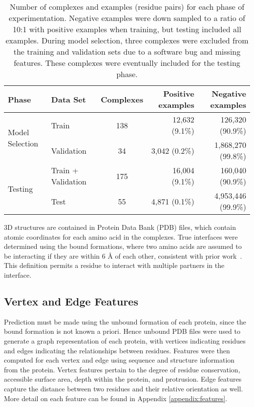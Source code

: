 \begin{table}
	\centering
	\begin{tabular}{l l c r r}
		\toprule
		Phase & Data Set & Complexes & Positive examples  & Negative examples \\ 
		\midrule
		\multirow{2}{*}{Model Selection} 
			& Train      & 138       & 12,632 (9.1\%)     & 126,320 (90.9\%) \\
			& Validation & 34        & 3,042 (0.2\%) 		& 1,868,270 (99.8\%) \\
		\midrule
		\multirow{2}{*}{Testing}
			& Train + Validation & 175 & 16,004 (9.1\%) & 160,040 (90.9\%) \\
			& Test       & 55        & 4,871 (0.1\%)      & 4,953,446 (99.9\%) \\ 
		\bottomrule
	\end{tabular}
	\caption{Number of complexes and examples (residue pairs) for each phase of experimentation. Negative examples were down sampled to a ratio of 10:1 with positive examples when training, but testing included all examples. During model selection, three complexes were excluded from the training and validation sets due to a software bug and missing features. These complexes were eventually included for the testing phase. \label{tab:dataset_size}}
	\label{tab:examples}
\end{table}

3D structures are contained in Protein Data Bank (PDB) files, which contain atomic coordinates for each amino acid in the complexes.
True interfaces were determined using the bound formations, where two amino acids are assumed to be interacting if they are within 6 \AA{} of each other, consistent with prior work~\cite{ofran2007, ahmad2011, minhas2014}.
This definition permits a residue to interact with multiple partners in the interface.

\subsection{Vertex and Edge Features}
Prediction must be made using the unbound formation of each protein, since the bound formation is not known a priori.
Hence unbound PDB files were used to generate a graph representation of each protein, with vertices indicating residues and edges indicating the relationships between residues.
Features were then computed for each vertex and edge using sequence and structure information from the protein.
Vertex features pertain to the degree of residue conservation, accessible surface area, depth within the protein, and protrusion.
Edge features capture the distance between two residues and their relative orientation as well.
More detail on each feature can be found in Appendix \ref{appendix:features}.


